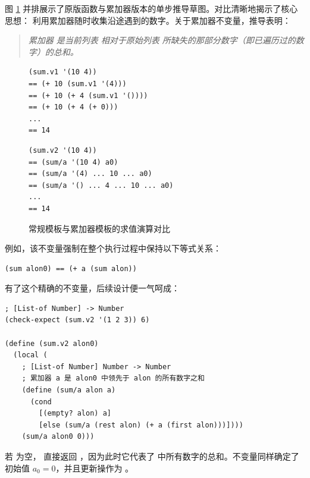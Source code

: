 图 \ref{fig:183} 并排展示了原版函数与累加器版本的单步推导草图。对比清晰地揭示了核心思想： 利用累加器随时收集沿途遇到的数字。关于累加器不变量，推导表明：
\begin{quote}
\textit{累加器  是当前列表  相对于原始列表  所缺失的那部分数字（即已遍历过的数字）的总和。}
\end{quote}

\begin{figure}[htbp]
  \centering
\begin{stepperbox}[unbreakable]
\begin{minipage}[t]{0.48\linewidth}
\begin{Verbatim}[fontsize=\fontsize{6.0pt}{7.2pt}\selectfont]
(sum.v1 '(10 4))
== (+ 10 (sum.v1 '(4)))
== (+ 10 (+ 4 (sum.v1 '())))
== (+ 10 (+ 4 (+ 0)))
...
== 14
\end{Verbatim}
\end{minipage}\hfill
\begin{minipage}[t]{0.48\linewidth}
\begin{Verbatim}[fontsize=\fontsize{6.0pt}{7.2pt}\selectfont]
(sum.v2 '(10 4))
== (sum/a '(10 4) a0)
== (sum/a '(4) ... 10 ... a0)
== (sum/a '() ... 4 ... 10 ... a0)
...
== 14
\end{Verbatim}
\end{minipage}
\end{stepperbox}
  \caption{常规模板与累加器模板的求值演算对比}
  \label{fig:183}
\end{figure}

例如，该不变量强制在整个执行过程中保持以下等式关系：
\begin{lstlisting}[language=BSL]
(sum alon0) == (+ a (sum alon))
\end{lstlisting}

有了这个精确的不变量，后续设计便一气呵成：
\begin{lstlisting}[language=BSL]
; [List-of Number] -> Number
(check-expect (sum.v2 '(1 2 3)) 6)

(define (sum.v2 alon0)
  (local (
    ; [List-of Number] Number -> Number
    ; 累加器 a 是 alon0 中领先于 alon 的所有数字之和
    (define (sum/a alon a)
      (cond
        [(empty? alon) a]
        [else (sum/a (rest alon) (+ a (first alon)))])))
    (sum/a alon0 0)))
\end{lstlisting}

若  为空， 直接返回 ，因为此时它代表了  中所有数字的总和。不变量同样确定了初始值 $a_0 = 0$，并且更新操作为 。

